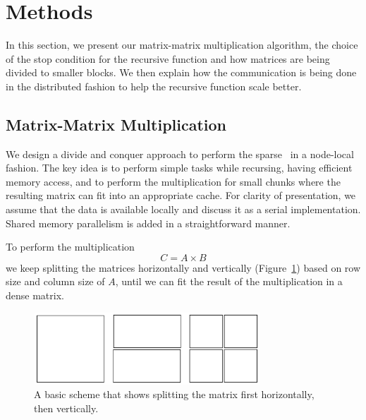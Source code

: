 \section{Methods}
\label{sec:methods}

In this section, we present our matrix-matrix multiplication algorithm, the choice of the stop condition for the recursive function and how matrices are being divided to smaller blocks. We then explain how the communication is being done in the distributed fashion to help the recursive function scale better.


\subsection{Matrix-Matrix Multiplication}
\label{sec:matmult}

We design a divide and conquer approach to perform the sparse \mm\ in a node-local fashion. The key idea is to perform simple tasks while recursing, having efficient memory access, and to perform the multiplication for small chunks where the resulting matrix can fit into an appropriate cache. For clarity of presentation, we assume that the data is available locally and discuss it as a serial implementation. Shared memory parallelism is added in a straightforward manner.

To perform the multiplication
\begin{equation}
    C = A \times B
\end{equation}
we keep splitting the matrices horizontally and vertically (Figure~\ref{fig:split2}) based on row size and column size of $A$, until we can fit the result of the multiplication in a dense matrix.

\begin{figure}[tbh]
 \centering
 \includegraphics[width=8.5cm,height=2.7cm]{./figures/split2.pdf}
 \caption{A basic scheme that shows splitting the matrix first horizontally, then vertically.}
 \label{fig:split2}
 \Description{}
\end{figure}


